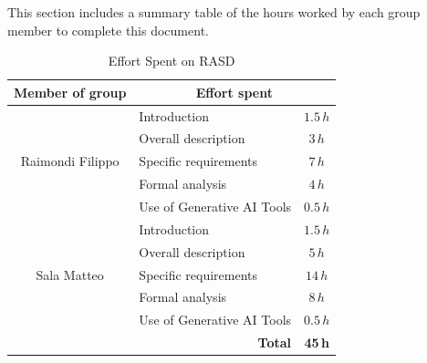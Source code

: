 This section includes a summary table of the hours worked by each group member to complete this document.

\begin{table}[h!]
\centering
\begin{tabular}{c|l|c}
\hline
Member of group & \multicolumn{2}{c}{Effort spent} \\
\hline
\multirow{5}{*}{Raimondi Filippo} 
 & Introduction & $1.5\,h$ \\
 & Overall description & $3\,h$ \\
 & Specific requirements & $7\,h$ \\
 & Formal analysis & $4\,h$ \\
 & Use of Generative AI Tools & $0.5\,h$ \\
\hline
\multirow{5}{*}{Sala Matteo} 
 & Introduction & $1.5\,h$ \\
 & Overall description & $5\,h$ \\
 & Specific requirements & $14\,h$ \\
 & Formal analysis & $8\,h$ \\
 & Use of Generative AI Tools & $0.5\,h$ \\
\hline
\multicolumn{2}{r|}{\textbf{Total}} & \textbf{45\,h} \\
\hline
\end{tabular}
\caption{Effort Spent on RASD}
\end{table}